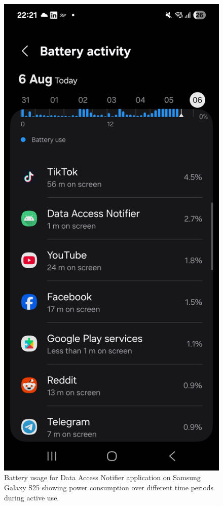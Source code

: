 \begin{figure}[H]
\begin{minipage}{0.32\textwidth}
\end{minipage}%
\hfill
\begin{minipage}{0.32\textwidth}
    \centering
    \includegraphics[width=\textwidth]{english/figures/IMG_20250809_225839_295.jpg}
\end{minipage}
\caption{Battery usage for Data Access Notifier application on Samsung Galaxy S25 showing power consumption over different time periods during active use.}
\label{fig:battery-usage}
\end{figure} 





